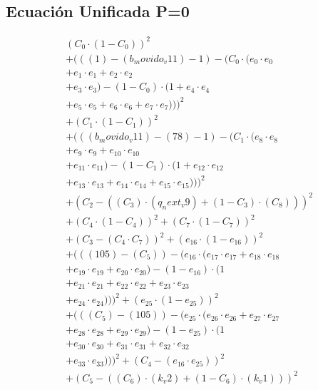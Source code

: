\documentclass[10pt, a4paper]{article}
\begin{document}
\subsection*{Ecuación Unificada P=0}
\begin{align*}
& (C_{0} \cdot (1 - C_{0}))^{2} \\
& + (((1) - (b_movido_v11) - 1) - (C_{0} \cdot (e_{0} \cdot e_{0} \\
& + e_{1} \cdot e_{1} + e_{2} \cdot e_{2} \\
& + e_{3} \cdot e_{3}) - (1 - C_{0}) \cdot (1 + e_{4} \cdot e_{4} \\
& + e_{5} \cdot e_{5} + e_{6} \cdot e_{6} + e_{7} \cdot e_{7})))^{2} \\
& + (C_{1} \cdot (1 - C_{1}))^{2} \\
& + (((b_movido_v11) - (78) - 1) - (C_{1} \cdot (e_{8} \cdot e_{8} \\
& + e_{9} \cdot e_{9} + e_{10} \cdot e_{10} \\
& + e_{11} \cdot e_{11}) - (1 - C_{1}) \cdot (1 + e_{12} \cdot e_{12} \\
& + e_{13} \cdot e_{13} + e_{14} \cdot e_{14} + e_{15} \cdot e_{15})))^{2} \\
& + (C_{2} - ((C_{3})  \cdot  (q_next_v9) + (1 - C_{3})  \cdot  (C_{8})))^{2} \\
& + (C_{4} \cdot (1 - C_{4}))^{2} + (C_{7} \cdot (1 - C_{7}))^{2} \\
& + (C_{3} - (C_{4} \cdot C_{7}))^{2} + (e_{16} \cdot (1 - e_{16}))^{2} \\
& + (((105) - (C_{5})) - (e_{16} \cdot (e_{17} \cdot e_{17} + e_{18} \cdot e_{18} \\
& + e_{19} \cdot e_{19} + e_{20} \cdot e_{20}) - (1 - e_{16}) \cdot (1 \\
& + e_{21} \cdot e_{21} + e_{22} \cdot e_{22} + e_{23} \cdot e_{23} \\
& + e_{24} \cdot e_{24})))^{2} + (e_{25} \cdot (1 - e_{25}))^{2} \\
& + (((C_{5}) - (105)) - (e_{25} \cdot (e_{26} \cdot e_{26} + e_{27} \cdot e_{27} \\
& + e_{28} \cdot e_{28} + e_{29} \cdot e_{29}) - (1 - e_{25}) \cdot (1 \\
& + e_{30} \cdot e_{30} + e_{31} \cdot e_{31} + e_{32} \cdot e_{32} \\
& + e_{33} \cdot e_{33})))^{2} + (C_{4} - (e_{16} \cdot e_{25}))^{2} \\
& + (C_{5} - ((C_{6})  \cdot  (k_v2) + (1 - C_{6})  \cdot  (k_v1)))^{2} \\

\end{align*}
\end{document}
